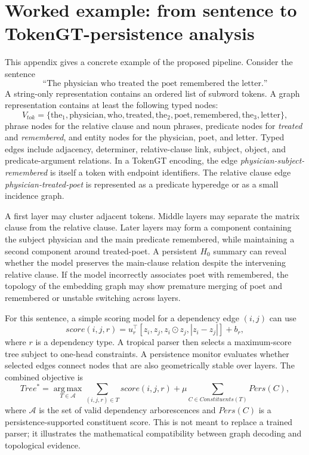 \documentclass[11pt]{article}
\newcommand{\argmax}{\operatorname*{arg\,max}}
\newcommand{\1}{\mathbf{1}}
\begin{document}
\section{Worked example: from sentence to TokenGT-persistence analysis}

This appendix gives a concrete example of the proposed pipeline. Consider the sentence
\[
\text{``The physician who treated the poet remembered the letter.''}
\]
A string-only representation contains an ordered list of subword tokens. A graph representation contains at least the following typed nodes:
\[
V_{tok}=\{\text{the}_1,\text{physician},\text{who},\text{treated},\text{the}_2,\text{poet},\text{remembered},\text{the}_3,\text{letter}\},
\]
phrase nodes for the relative clause and noun phrases, predicate nodes for \emph{treated} and \emph{remembered}, and entity nodes for the physician, poet, and letter. Typed edges include adjacency, determiner, relative-clause link, subject, object, and predicate-argument relations. In a TokenGT encoding, the edge \emph{physician-subject-remembered} is itself a token with endpoint identifiers. The relative clause edge \emph{physician-treated-poet} is represented as a predicate hyperedge or as a small incidence graph.

A first layer may cluster adjacent tokens. Middle layers may separate the matrix clause from the relative clause. Later layers may form a component containing the subject physician and the main predicate remembered, while maintaining a second component around treated-poet. A persistent $H_0$ summary can reveal whether the model preserves the main-clause relation despite the intervening relative clause. If the model incorrectly associates poet with remembered, the topology of the embedding graph may show premature merging of poet and remembered or unstable switching across layers.

For this sentence, a simple scoring model for a dependency edge $(i,j)$ can use
\[
score(i,j,r)=u_r^\top [z_i,z_j,z_i\odot z_j,|z_i-z_j|] + b_r,
\]
where $r$ is a dependency type. A tropical parser then selects a maximum-score tree subject to one-head constraints. A persistence monitor evaluates whether selected edges connect nodes that are also geometrically stable over layers. The combined objective is
\[
Tree^*=\argmax_{T\in\mathcal{A}}\sum_{(i,j,r)\in T}score(i,j,r)+\mu\sum_{C\in Constituents(T)}Pers(C),
\]
where $\mathcal{A}$ is the set of valid dependency arborescences and $Pers(C)$ is a persistence-supported constituent score. This is not meant to replace a trained parser; it illustrates the mathematical compatibility between graph decoding and topological evidence.
\end{document}
